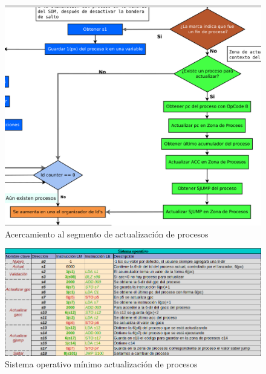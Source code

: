 \documentclass[letterpaper,12pt,oneside]{book}
\begin{document}
			\begin{figure}[h]		
				\centering
				\includegraphics[scale=0.4]{media/Paralela/diag_somp_update_process.png}
				\caption{Acercamiento al segmento de actualización de procesos}
				\label{fig:diag_somp_update_process}
			\end{figure}


			\begin{figure}[h]		
				\centering
				\includegraphics[scale=0.53]{media/Paralela/sop_update.png}
				\caption{Sistema operativo mínimo actualización de procesos}
				\label{fig:sop_update}
			\end{figure}
\end{document}
